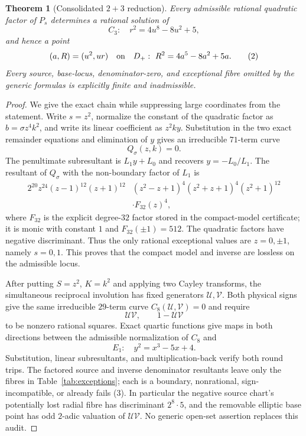 \documentclass[11pt]{article}
\newtheorem{theorem}{Theorem}
\begin{document}
\begin{theorem}[Consolidated $2+3$ reduction]\label{thm:reduction}
Every admissible rational quadratic factor of $P_s$ determines a rational
solution of
\[
 C_3:\quad r^2=4u^8-8u^2+5,                         \tag{1}
\]
and hence a point
\[
 (a,R)=(u^2,ur)
\quad\hbox{on}\quad
 D_+:\ R^2=4a^5-8a^2+5a.                            \tag{2}
\]
Every source, base-locus, denominator-zero, and exceptional fibre omitted
by the generic formulas is explicitly finite and inadmissible.
\end{theorem}

\begin{proof}
We give the exact chain while suppressing large coordinates from the
statement.  Write $s=z^2$, normalize the constant of the quadratic factor as
$b=\sigma z^4k^2$, and write its linear coefficient as $z^2ky$.
Substitution in the two exact remainder equations and elimination of $y$
gives an irreducible $71$-term curve
\[
 Q_\sigma(z,k)=0.
\]
The penultimate subresultant is $L_1y+L_0$ and recovers
$y=-L_0/L_1$.  The resultant of $Q_\sigma$ with the non-boundary factor of
$L_1$ is
\[
\begin{aligned}
2^{20}z^{24}(z-1)^{12}(z+1)^{12}
 &(z^2-z+1)^4(z^2+z+1)^4(z^2+1)^{12}\\
 &\cdot F_{32}(z)^4,
\end{aligned}
\]
where $F_{32}$ is the explicit degree-$32$ factor stored in the compact-model
certificate; it is monic with constant $1$ and $F_{32}(\pm1)=512$.  The
quadratic factors have negative discriminant.  Thus the only rational
exceptional values are $z=0,\pm1$, namely $s=0,1$.  This proves that the
compact model and inverse are lossless on the admissible locus.

After putting $S=z^2$, $K=k^2$ and applying two Cayley transforms, the
simultaneous reciprocal involution has fixed generators
$\mathcal U,\mathcal V$.  Both physical signs give the same irreducible
$29$-term curve $C_8(\mathcal U,\mathcal V)=0$ and require
\[
 \mathcal U\mathcal V,\qquad 1-\mathcal U\mathcal V       \tag{3}
\]
to be nonzero rational squares.  Exact quartic functions give maps in both
directions between the admissible normalization of $C_8$ and
\[
 E_1:\quad y^2=x^3-5x+4.                                \tag{4}
\]
Substitution, linear subresultants, and multiplication-back verify both
round trips.  The factored source and inverse denominator resultants leave
only the fibres in Table~\ref{tab:exceptions}; each is a boundary,
nonrational, sign-incompatible, or already fails (3).  In particular the
negative source chart's potentially lost radial fibre has discriminant
$2^8\cdot5$, and the removable elliptic base point has odd $2$-adic
valuation of $\mathcal U\mathcal V$.  No generic open-set assertion replaces
this audit.


\end{proof}
\end{document}
